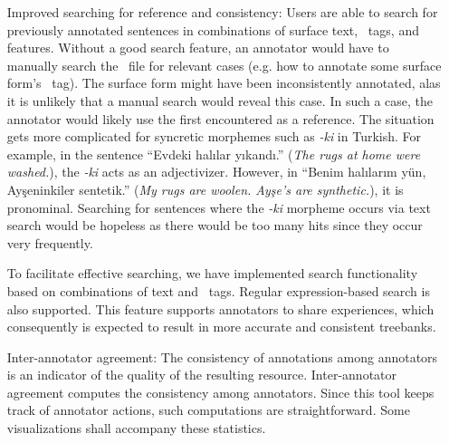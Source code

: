 \begin{itemize}[before=\normalfont, font=\itshape, align=left,noitemsep,topsep=0pt,parsep=3pt,partopsep=0pt,labelsep=3pt,align=left]
    \item[Improved searching for reference and consistency:]
        Users are able to search for previously annotated sentences in combinations of surface text, \ud\ tags, and features.
		Without a good search feature, an annotator would have to manually search the \conllu\ file for relevant cases (e.g. how to annotate some surface form's \upos\ tag).
		The surface form might have been inconsistently annotated, alas it is unlikely that a manual search would reveal this case.
		In such a case, the annotator would likely use the first encountered as a reference.
        The situation gets more complicated for syncretic morphemes such as \textit{-ki} in Turkish.
        For example, in the sentence ``Evdeki halılar yıkandı.'' (\textit{The rugs at home were washed.}), the \textit{-ki} acts as an adjectivizer.
        However, in ``Benim halılarım yün, Ayşeninkiler sentetik.'' (\textit{My rugs are woolen. Ayşe's are synthetic.}), it is pronominal.
        Searching for sentences where the \textit{-ki} morpheme occurs via text search would be hopeless as there would be too many hits since they occur very frequently.

        To facilitate effective searching, we have implemented search functionality based on combinations of text and \ud\ tags.
        Regular expression-based search is also supported.
        This feature supports annotators to share experiences, which consequently is expected to result in more accurate and consistent treebanks.

    \item[Inter-annotator agreement:]
        The consistency of annotations among annotators is an indicator of the quality of the resulting resource.
        Inter-annotator agreement computes the consistency among annotators.
        Since this tool keeps track of annotator actions, such computations are straightforward.
        Some visualizations shall accompany these statistics.

\end{itemize}
